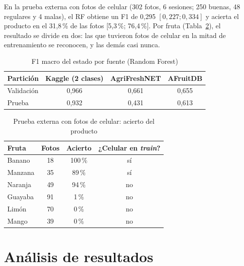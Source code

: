 \documentclass[conference]{IEEEtran}
\begin{document}
En la prueba externa con fotos de celular (302 fotos, 6 sesiones; 250 buenas, 48 regulares y 4 malas), el RF obtiene un F1 de 0,295 $[0{,}227;0{,}334]$ y acierta el producto en el 31,8\,\% de las fotos [5,3\,\%; 76,4\,\%]. Por fruta (Tabla~\ref{tab:celular}), el resultado se divide en dos: las que tuvieron fotos de celular en la mitad de entrenamiento se reconocen, y las demás casi nunca.

\begin{table}[t]
\caption{F1 macro del estado por fuente (Random Forest)}
\label{tab:fuente}
\centering
\scriptsize
\begin{tabular}{@{}lccc@{}}
\toprule
Partición & Kaggle (2 clases) & AgriFreshNET & AFruitDB\\
\midrule
Validación & 0,966 & 0,661 & 0,655\\
Prueba & 0,932 & 0,431 & 0,613\\
\bottomrule
\end{tabular}
\end{table}

\begin{table}[t]
\caption{Prueba externa con fotos de celular: acierto del producto}
\label{tab:celular}
\centering
\scriptsize
\begin{tabular}{@{}lccc@{}}
\toprule
Fruta & Fotos & Acierto & ¿Celular en \emph{train}?\\
\midrule
Banano & 18 & 100\,\% & sí\\
Manzana & 35 & 89\,\% & sí\\
Naranja & 49 & 94\,\% & no\\
Guayaba & 91 & 1\,\% & no\\
Limón & 70 & 0\,\% & no\\
Mango & 39 & 0\,\% & no\\
\bottomrule
\end{tabular}
\end{table}

\section{Análisis de resultados}
\end{document}
